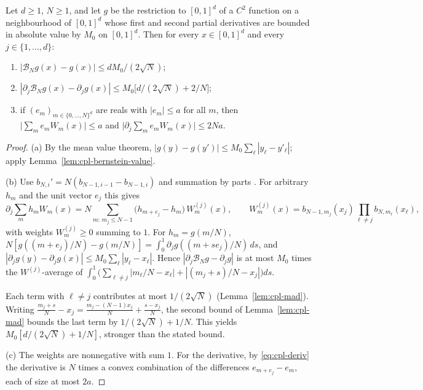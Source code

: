 \begin{proposition}\label{prop:cpl-bernstein}
Let $d\ge1$, $N\ge1$, and let $g$ be the restriction to $[0,1]^d$ of a $C^2$ function on a neighbourhood of
$[0,1]^d$ whose first and second partial derivatives are bounded in absolute value by $M_0$ on $[0,1]^d$. Then for
every $x\in[0,1]^d$ and every $j\in\{1,\dots,d\}$:
\begin{enumerate}[label=(\alph*)]
\item $|\mathcal B_Ng(x)-g(x)|\le dM_0/(2\sqrt N)$;
\item $|\partial_j\mathcal B_Ng(x)-\partial_jg(x)|\le M_0\bigl[d/(2\sqrt N)+2/N\bigr]$;
\item if $(e_m)_{m\in\{0,\dots,N\}^d}$ are reals with $|e_m|\le a$ for all $m$, then
 $\bigl|\sum_me_mW_m(x)\bigr|\le a$ and $\bigl|\partial_j\sum_me_mW_m(x)\bigr|\le2Na$.
\end{enumerate}
\end{proposition}

\begin{proof}
(a) By the mean value theorem, $|g(y)-g(y')|\le M_0\sum_\ell|y_\ell-y'_\ell|$; apply Lemma~\ref{lem:cpl-bernstein-value}.

(b) Use $b_{N,i}'=N(b_{N-1,i-1}-b_{N-1,i})$ and summation by parts \cite[\S1.4]{Lorentz1986}. For arbitrary $h_m$ and the unit vector $e_j$ this gives
\begin{equation}\label{eq:cpl-deriv}
 \partial_j\sum_mh_mW_m(x)=N\sum_{m:\,m_j\le N-1}\bigl(h_{m+e_j}-h_m\bigr)\,W^{(j)}_m(x),\qquad
 W^{(j)}_m(x)=b_{N-1,m_j}(x_j)\prod_{\ell\ne j}b_{N,m_\ell}(x_\ell),
\end{equation}
with weights $W^{(j)}_m\ge0$ summing to $1$. For $h_m=g(m/N)$, $N[g((m+e_j)/N)-g(m/N)]=\int_0^1\partial_jg((m+se_j)/N)\,ds$, and $|\partial_jg(y)-\partial_jg(x)|\le M_0\sum_\ell|y_\ell-x_\ell|$. Hence $|\partial_j\mathcal B_Ng-\partial_jg|$ is at most $M_0$ times the $W^{(j)}$-average of $\int_0^1\bigl(\sum_{\ell\ne j}|m_\ell/N-x_\ell|+|(m_j+s)/N-x_j|\bigr)ds$.

Each term with $\ell\ne j$ contributes at most $1/(2\sqrt N)$ (Lemma~\ref{lem:cpl-mad}). Writing $\frac{m_j+s}N-x_j=\frac{m_j-(N-1)x_j}N+\frac{s-x_j}N$, the second bound of Lemma~\ref{lem:cpl-mad} bounds the last term by $1/(2\sqrt N)+1/N$. This yields $M_0[d/(2\sqrt N)+1/N]$, stronger than the stated bound.

(c) The weights are nonnegative with sum $1$. For the derivative, by \eqref{eq:cpl-deriv} the derivative is $N$ times a convex combination of the differences $e_{m+e_j}-e_m$, each of size at most $2a$.
\end{proof}

